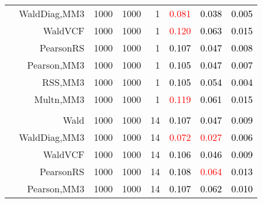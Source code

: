 \documentclass[
]{article}
\begin{document}
\begin{table}[H]
{\begin{tabular}[t]{lrrrrrrr}
\hspace{1em} & WaldDiag,MM3 & 1000 & 1000 & 1 & \textcolor{red}{0.081} & \textcolor{black}{0.038} & \textcolor{black}{0.005}\\

\hspace{1em} & WaldVCF & 1000 & 1000 & 1 & \textcolor{red}{0.120} & \textcolor{black}{0.063} & \textcolor{black}{0.015}\\

\hspace{1em} & PearsonRS & 1000 & 1000 & 1 & \textcolor{black}{0.107} & \textcolor{black}{0.047} & \textcolor{black}{0.008}\\

\hspace{1em} & Pearson,MM3 & 1000 & 1000 & 1 & \textcolor{black}{0.105} & \textcolor{black}{0.047} & \textcolor{black}{0.007}\\

\hspace{1em} & RSS,MM3 & 1000 & 1000 & 1 & \textcolor{black}{0.105} & \textcolor{black}{0.054} & \textcolor{black}{0.004}\\

\hspace{1em} & Multn,MM3 & 1000 & 1000 & 1 & \textcolor{red}{0.119} & \textcolor{black}{0.061} & \textcolor{black}{0.015}\\
\cmidrule{1-8}
\addlinespace[0.3em]
\multicolumn{8}{l}{\textbf{1F 15V}}\\
\hspace{1em} & Wald & 1000 & 1000 & 14 & \textcolor{black}{0.107} & \textcolor{black}{0.047} & \textcolor{black}{0.009}\\

\hspace{1em} & WaldDiag,MM3 & 1000 & 1000 & 14 & \textcolor{red}{0.072} & \textcolor{red}{0.027} & \textcolor{black}{0.006}\\

\hspace{1em} & WaldVCF & 1000 & 1000 & 14 & \textcolor{black}{0.106} & \textcolor{black}{0.046} & \textcolor{black}{0.009}\\

\hspace{1em} & PearsonRS & 1000 & 1000 & 14 & \textcolor{black}{0.108} & \textcolor{red}{0.064} & \textcolor{black}{0.013}\\

\hspace{1em} & Pearson,MM3 & 1000 & 1000 & 14 & \textcolor{black}{0.107} & \textcolor{black}{0.062} & \textcolor{black}{0.010}\\


\end{tabular}}
\end{table}
\end{document}
